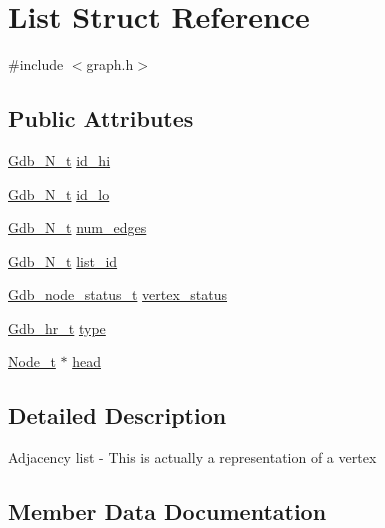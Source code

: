 \hypertarget{structList}{}\section{List Struct Reference}
\label{structList}


{\ttfamily \#include $<$graph.\+h$>$}

\subsection*{Public Attributes}
\begin{DoxyCompactItemize}
\item 
\hyperlink{primitives_8h_a859f3e5b0c42fd108b94dfb804f70440}{Gdb\+\_\+\+N\+\_\+t} \hyperlink{structList_a16979de39b14c5f20b993dd039e3df54}{id\+\_\+hi}
\item 
\hyperlink{primitives_8h_a859f3e5b0c42fd108b94dfb804f70440}{Gdb\+\_\+\+N\+\_\+t} \hyperlink{structList_a747f801d0a265be040e9277a9328ae99}{id\+\_\+lo}
\item 
\hyperlink{primitives_8h_a859f3e5b0c42fd108b94dfb804f70440}{Gdb\+\_\+\+N\+\_\+t} \hyperlink{structList_a057ef7e4f38226d61b1069edfc54eb55}{num\+\_\+edges}
\item 
\hyperlink{primitives_8h_a859f3e5b0c42fd108b94dfb804f70440}{Gdb\+\_\+\+N\+\_\+t} \hyperlink{structList_ad361603380931b7a2b04e4b367525f80}{list\+\_\+id}
\item 
\hyperlink{primitives_8h_acb48953e54c79cf63bf3e38632347ffb}{Gdb\+\_\+node\+\_\+status\+\_\+t} \hyperlink{structList_adb605295623ba6ef67a3d2b7550ad8b2}{vertex\+\_\+status}
\item 
\hyperlink{primitives_8h_adc088f5af2bb04014551ec868bfe92cf}{Gdb\+\_\+hr\+\_\+t} \hyperlink{structList_a9500b07a968a38aebec491f92df9f7b3}{type}
\item 
\hyperlink{graph_8h_a15c592b9993713c4f45091fb9b8c9e27}{Node\+\_\+t} $\ast$ \hyperlink{structList_a6ea62266a29cafe9244d1388ed8feaab}{head}
\end{DoxyCompactItemize}


\subsection{Detailed Description}
Adjacency list -\/ This is actually a representation of a vertex 

\subsection{Member Data Documentation}
